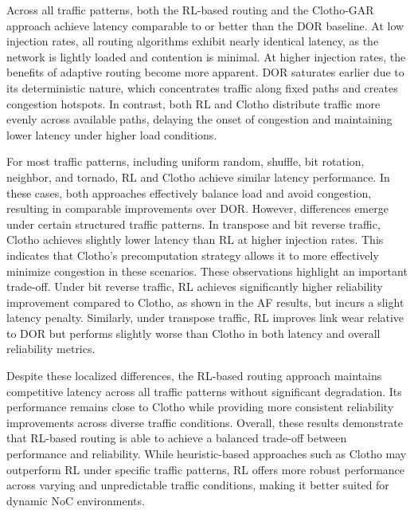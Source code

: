 Across all traffic patterns, both the RL-based routing and the Clotho-GAR approach achieve latency comparable to or better than the DOR baseline. At low injection rates, all routing algorithms exhibit nearly identical latency, as the network is lightly loaded and contention is minimal. At higher injection rates, the benefits of adaptive routing become more apparent. DOR saturates earlier due to its deterministic nature, which concentrates traffic along fixed paths and creates congestion hotspots. In contrast, both RL and Clotho distribute traffic more evenly across available paths, delaying the onset of congestion and maintaining lower latency under higher load conditions.

For most traffic patterns, including uniform random, shuffle, bit rotation, neighbor, and tornado, RL and Clotho achieve similar latency performance. In these cases, both approaches effectively balance load and avoid congestion, resulting in comparable improvements over DOR. However, differences emerge under certain structured traffic patterns. In transpose and bit reverse traffic, Clotho achieves slightly lower latency than RL at higher injection rates. This indicates that Clotho's precomputation strategy allows it to more effectively minimize congestion in these scenarios. These observations highlight an important trade-off. Under bit reverse traffic, RL achieves significantly higher reliability improvement compared to Clotho, as shown in the AF results, but incurs a slight latency penalty. Similarly, under transpose traffic, RL improves link wear relative to DOR but performs slightly worse than Clotho in both latency and overall reliability metrics. 

Despite these localized differences, the RL-based routing approach maintains competitive latency across all traffic patterns without significant degradation. Its performance remains close to Clotho while providing more consistent reliability improvements across diverse traffic conditions. Overall, these results demonstrate that RL-based routing is able to achieve a balanced trade-off between performance and reliability. While heuristic-based approaches such as Clotho may outperform RL under specific traffic patterns, RL offers more robust performance across varying and unpredictable traffic conditions, making it better suited for dynamic NoC environments.


